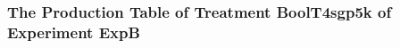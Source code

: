  \begin{frame}
 \fontsize{8pt}{9pt}\selectfont
 \frametitle{ The Production Table of Treatment BoolT4sgp5k of Experiment ExpB }

 \label{ExpBGrammarTable031.tex}  
 \end{frame}

